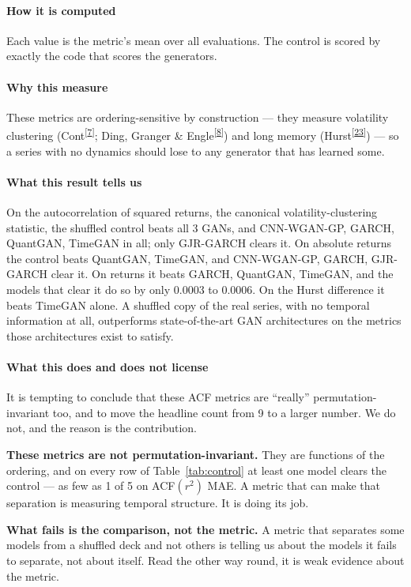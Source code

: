 \documentclass[11pt,a4paper]{article}
\makeatletter
\newcommand{\tcite}[1]{\textsuperscript{[\hyperlink{R:#1}{#1}]}}
\DeclareRobustCommand{\_}{\ifmmode\nfss@text{\textunderscore}\else\textunderscore\allowbreak\fi}
\makeatother
\begin{document}
\paragraph{How it is computed} Each value is the metric's mean over all evaluations. The control is scored by exactly the code that scores the generators.

\paragraph{Why this measure} These metrics are ordering-sensitive by construction --- they measure volatility clustering (Cont\tcite{7}; Ding, Granger \& Engle\tcite{8}) and long memory (Hurst\tcite{23}) --- so a series with no dynamics should lose to any generator that has learned some.

\paragraph{What this result tells us} On the autocorrelation of squared returns, the canonical volatility-clustering statistic, the shuffled control beats all 3 GANs, and CNN-WGAN-GP, GARCH, QuantGAN, TimeGAN in all; only GJR-GARCH clears it. On absolute returns the control beats QuantGAN, TimeGAN, and CNN-WGAN-GP, GARCH, GJR-GARCH clear it. On returns it beats GARCH, QuantGAN, TimeGAN, and the models that clear it do so by only 0.0003 to 0.0006. On the Hurst difference it beats TimeGAN alone. A shuffled copy of the real series, with no temporal information at all, outperforms state-of-the-art GAN architectures on the metrics those architectures exist to satisfy.

\paragraph{What this does and does not license} It is tempting to conclude that these ACF metrics are ``really'' permutation-invariant too, and to move the headline count from 9 to a larger number. We do not, and the reason is the contribution.

\textbf{These metrics are not permutation-invariant.} They are functions of the ordering, and on every row of Table~\ref{tab:control} at least one model clears the control --- as few as 1 of 5 on ACF$(r^2)$ MAE. A metric that can make that separation is measuring temporal structure. It is doing its job.

\textbf{What fails is the comparison, not the metric.} A metric that separates some models from a shuffled deck and not others is telling us about the models it fails to separate, not about itself. Read the other way round, it is weak evidence about the metric.
\end{document}
